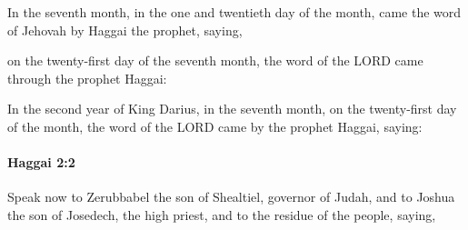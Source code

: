 			\begin{versebox}
					\item[BHS] 
					\item[LXX] 
					\item[ASV] In the seventh month, in the one and twentieth day of the month, came the word of Jehovah by Haggai the prophet, saying,
					\item[NIV] on the twenty-first day of the seventh month, the word of the LORD came through the prophet Haggai:
					\item[NRSV] In the second year of King Darius, in the seventh month, on the twenty-first day of the month, the word of the LORD came by the prophet Haggai, saying:
			\end{versebox}

		\paragraph{Haggai 2:2} %
			\label{HAGGAI-2-2}

			Speak now to Zerubbabel the son of Shealtiel, governor of Judah, and to Joshua the son of Josedech, the high priest, and to the residue of the people, saying,

